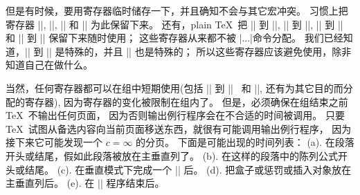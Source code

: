 \danger \1但是有时候，要用寄存器临时储存一下，并且确知不会与其它宏冲突。%
习惯上把寄存器 ||, ||, || 和 || 为此保留下来。%
还有，plain \TeX\ 把 || 到 ||, || 到 ||, || 到 %
|| 和 || 到 || 保留下来随时使用；
这些寄存器从来都不被 |\new...|\null 命令分配。%
我们已经知道，|| 到 || 是特殊的，并且 || 也是特殊的；
所以这些寄存器应该避免使用，除非知道自己在做什么。

\ddanger 当然，任何寄存器都可以在组中短期使用(包括 || 到 ||~%
和 ||, 还有为其它目的而分配的寄存器),
因为寄存器的变化被限制在组内了。%
但是，必须确保在组结束之前 \TeX\ 不输出任何页面，
因为否则输出例行程序会在不合适的时间被调用。%
只要 \TeX\ 试图从备选内容向当前页面移送东西，就很有可能调用输出例行程序，
因为接下来它可能发现一个 $c=\infty$ 的分页。%
下面是可能出现的时间列表：
(a). 在段落开头或结尾，假如此段落被放在主垂直列了。%
(b). 在这样的段落中的陈列公式开头或结尾。%
(c). 在垂直模式下完成一个 |\halign| 后。%
(d). 把盒子或惩罚或插入对象放在主垂直列后。%
(e). 在 |\output| 程序结束后。

